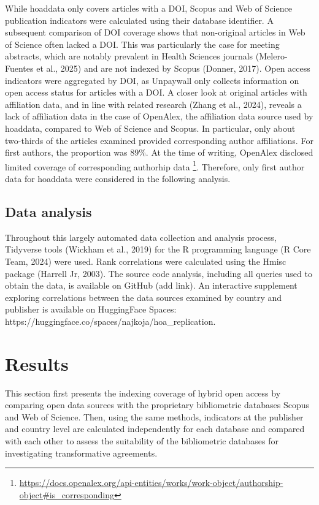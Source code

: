 \documentclass[a4paper,man,floatsintext,longtable,noextraspace,10pt]{apa6}
\begin{document}
While hoaddata only covers articles with a DOI, Scopus and Web of
Science publication indicators were calculated using their database
identifier. A subsequent comparison of DOI coverage shows that
non-original articles in Web of Science often lacked a DOI. This was
particularly the case for meeting abstracts, which are notably prevalent
in Health Sciences journals (Melero-Fuentes et al., 2025) and are not
indexed by Scopus (Donner, 2017). Open access indicators were aggregated
by DOI, as Unpaywall only collects information on open access status for
articles with a DOI. A closer look at original articles with affiliation
data, and in line with related research (Zhang et al., 2024), reveals a
lack of affiliation data in the case of OpenAlex, the affiliation data
source used by hoaddata, compared to Web of Science and Scopus. In
particular, only about two-thirds of the articles examined provided
corresponding author affiliations. For first authors, the proportion was
89\%. At the time of writing, OpenAlex disclosed limited coverage of
corresponding authorhip data \footnote{\url{https://docs.openalex.org/api-entities/works/work-object/authorship-object\#is_corresponding}}.
Therefore, only first author data for hoaddata were considered in the
following analysis.

\subsection{Data analysis}\label{data-analysis}

Throughout this largely automated data collection and analysis process,
Tidyverse tools (Wickham et al., 2019) for the R programming language (R
Core Team, 2024) were used. Rank correlations were calculated using the
Hmisc package (Harrell Jr, 2003). The source code analysis, including
all queries used to obtain the data, is available on GitHub (add link).
An interactive supplement exploring correlations between the data
sources examined by country and publisher is available on HuggingFace
Spaces: https://huggingface.co/spaces/najkoja/hoa\_replication.

\section{Results}\label{results}

This section first presents the indexing coverage of hybrid open access
by comparing open data sources with the proprietary bibliometric
databases Scopus and Web of Science. Then, using the same methods,
indicators at the publisher and country level are calculated
independently for each database and compared with each other to assess
the suitability of the bibliometric databases for investigating
transformative agreements.
\end{document}
